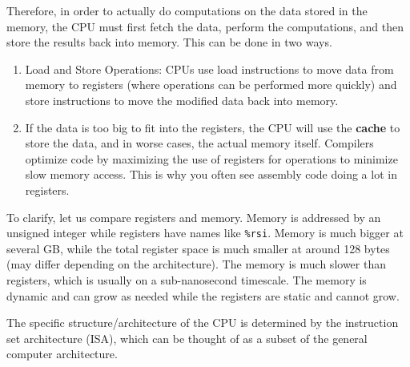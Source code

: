     Therefore, in order to actually do computations on the data stored in the memory, the CPU must first fetch the data, perform the computations, and then store the results back into memory. This can be done in two ways.

    \begin{enumerate}
      \item Load and Store Operations: CPUs use load instructions to move data from memory to registers (where operations can be performed more quickly) and store instructions to move the modified data back into memory.
      \item If the data is too big to fit into the registers, the CPU will use the \textbf{cache} to store the data, and in worse cases, the actual memory itself. Compilers optimize code by maximizing the use of registers for operations to minimize slow memory access. This is why you often see assembly code doing a lot in registers.
    \end{enumerate}

    To clarify, let us compare registers and memory. Memory is addressed by an unsigned integer while registers have names like \texttt{\%rsi}. Memory is much bigger at several GB, while the total register space is much smaller at around 128 bytes (may differ depending on the architecture). The memory is much slower than registers, which is usually on a sub-nanosecond timescale. The memory is dynamic and can grow as needed while the registers are static and cannot grow.

    The specific structure/architecture of the CPU is determined by the instruction set architecture (ISA), which can be thought of as a subset of the general computer architecture. 

